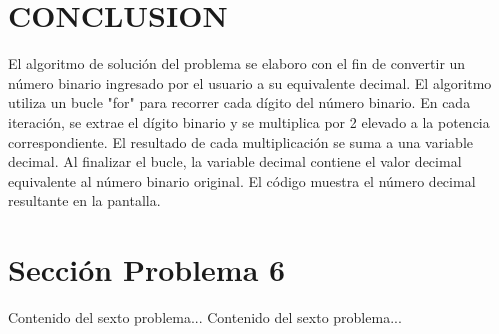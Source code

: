 \documentclass{IEEEcsmag}
\begin{document}
\section{CONCLUSION}
El algoritmo de solución del problema se elaboro con el fin de convertir un número binario ingresado por el usuario a su equivalente decimal. El algoritmo utiliza un bucle "for" para recorrer cada dígito del número binario. En cada iteración, se extrae el dígito binario y se multiplica por 2 elevado a la potencia correspondiente. El resultado de cada multiplicación se suma a una variable decimal. Al finalizar el bucle, la variable decimal contiene el valor decimal equivalente al número binario original. El código muestra el número decimal resultante en la pantalla.











































































\section{Sección Problema 6}
Contenido del sexto problema...
\newpage 
Contenido del sexto problema...
\newpage 
\end{document}
